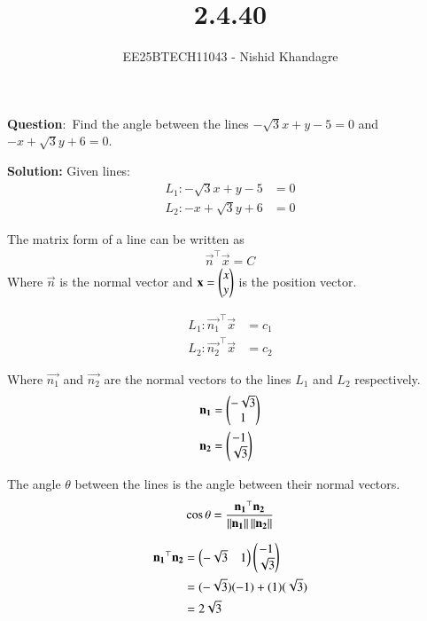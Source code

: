 \documentclass[journal]{IEEEtran}
\title{2.4.40}
\author{EE25BTECH11043 - Nishid Khandagre}
\begin{document}
\maketitle

\renewcommand{\thefigure}{\theenumi}
\renewcommand{\thetable}{\theenumi}


\textbf{Question}:\
Find the angle between the lines $-\sqrt{3}x + y - 5 = 0$ and $- x + \sqrt{3}y + 6 = 0$.

\textbf{Solution: }
Given lines:
\begin{align}
L_1: -\sqrt{3}x + y - 5 &= 0 \\
L_2: - x + \sqrt{3}y + 6 &= 0
\end{align}

The matrix form of a line can be written as \\ 
\begin{align}
\vec{n}^\top \vec{x} = C
\end{align}
Where $\vec{n}$ is the normal vector and $\mathbf{x} = \begin{pmatrix}x \\ y\end{pmatrix}$ is the position vector.


\begin{align}
L_1: \vec{n_1}^\top\vec{x}&=c_1\\
L_2: \vec{n_2}^\top\vec{x}&=c_2
\end{align}

Where $\vec{n_1}$ and $\vec{n_2}$ are the normal vectors to the lines $L_1$ and $L_2$ respectively.
\begin{align}
\mathbf{n_1} &= \begin{pmatrix}-\sqrt{3} \\ 1\end{pmatrix} \\
\mathbf{n_2} &= \begin{pmatrix}-1 \\ \sqrt{3}\end{pmatrix}
\end{align}

The angle $\theta$ between the lines is the angle between their normal vectors.
\begin{align}
\cos \theta = \frac{\mathbf{n_1}^\top \mathbf{n_2}}{\left\lVert\mathbf{n_1}\right\rVert \left\lVert\mathbf{n_2}\right\rVert} \label{eq:equation}
\end{align}



\begin{align}
\mathbf{n_1}^\top \mathbf{n_2} &= \begin{pmatrix} -\sqrt{3} & 1 \end{pmatrix} \begin{pmatrix}-1 \\ \sqrt{3}\end{pmatrix} \\
&= (-\sqrt{3})(-1) + (1)(\sqrt{3}) \\
&= 2\sqrt{3}
\end{align}
\end{document}
